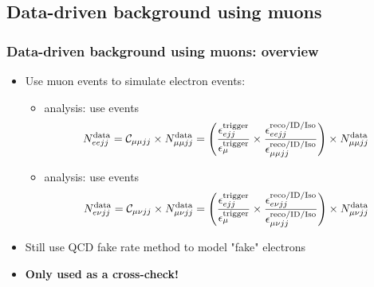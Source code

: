\documentclass[bigger]{beamer}
\providecommand{\alert}[1]{\textbf{#1}}
\begin{document}
\subsection{Data-driven background using muons}
\label{sec-1-6}
\begin{frame}
\frametitle{Data-driven background using muons: overview}
\label{sec-1-6-1}
\label{sec-1-6-1-1}

\begin{itemize}
\item Use muon events to simulate electron events:
\begin{itemize}
\item \eejj analysis: use \mumujj events
\begin{equation*}
  N_{eejj}^{\text{data}} = \mathcal{C}_{\mu\mu jj} \times N_{\mu\mu jj}^{\text{data}} = \left( \frac{\epsilon^{\text{trigger}}_{ejj}}{\epsilon^{\text{trigger}}_{\mu}} \times \frac{\epsilon^{\text{reco} / \text{ID} / \text{Iso}}_{eejj}}{\epsilon^{\text{reco} / \text{ID} / \text{Iso}}_{\mu\mu jj}} \right) \times N_{\mu\mu jj}^{\text{data}}
\end{equation*}
\item \enujj analysis: use \munujj events
\begin{equation*}
  N_{e\nu jj}^{\text{data}} = \mathcal{C}_{\mu\nu jj} \times N_{\mu\nu jj}^{\text{data}} = \left( \frac{\epsilon^{\text{trigger}}_{ejj}}{\epsilon^{\text{trigger}}_{\mu}} \times \frac{\epsilon^{\text{reco} / \text{ID} / \text{Iso}}_{e\nu jj}}{\epsilon^{\text{reco} / \text{ID} / \text{Iso}}_{\mu\nu jj}} \right) \times N_{\mu\nu jj}^{\text{data}}
\end{equation*}
\end{itemize}
\item Still use QCD fake rate method to model "fake" electrons
\item \alert{Only used as a cross-check!}
\end{itemize}
\end{frame}
\end{document}
